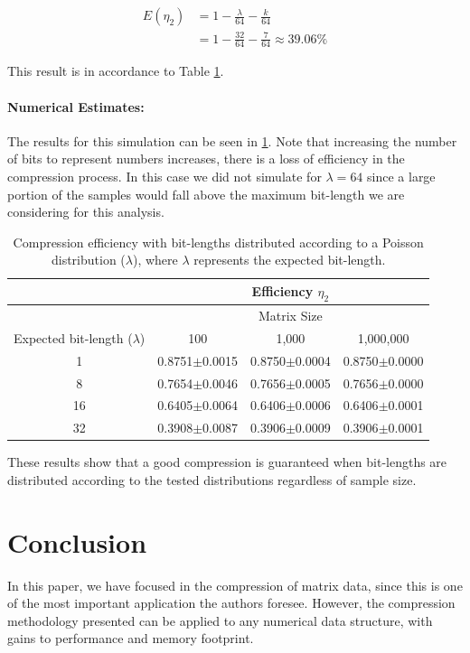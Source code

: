 \documentclass[10pt]{article}
\begin{document}
\begin{align}
 E(\eta_2) &= 1 - \frac{\lambda}{64} - \frac{k}{64} \label{eq:49} \\
 &= 1 - \frac{32}{64} - \frac{7}{64} \approx 39.06\% \label{eq:50}
\end{align}

This result is in accordance to Table \ref{tab:05}.
\paragraph{Numerical Estimates:}
The results for this simulation can be seen in \ref{tab:05}. Note that increasing the number of bits to represent numbers increases, there is a loss of efficiency in the compression process. In this case we did not simulate for $\lambda=64$ since a large portion of the samples would fall above the maximum bit-length we are considering for this analysis. 

 \begin{table}[h]
   \centering
   \caption{Compression efficiency with bit-lengths distributed according to a Poisson distribution ($\lambda$), where $\lambda$ represents the expected bit-length.}
  \begin{tabular}{cccc}
      \hline
      &&Efficiency $\eta_2$      & \\
      \hline
      &&Matrix Size& \\
      Expected bit-length ($\lambda$)	& 100	& 1,000		    & 1,000,000 \\
      \hline
      1 	& 0.8751$\pm$0.0015 	& 0.8750$\pm$0.0004 & 0.8750$\pm$0.0000 \\ 
      8 	& 0.7654$\pm$0.0046 	& 0.7656$\pm$0.0005 & 0.7656$\pm$0.0000 \\ 
      16 	& 0.6405$\pm$0.0064 	& 0.6406$\pm$0.0006 & 0.6406$\pm$0.0001 \\ 
      32 	& 0.3908$\pm$0.0087 	& 0.3906$\pm$0.0009 & 0.3906$\pm$0.0001 \\ 
      \hline
  \end{tabular}
  \label{tab:05}
 \end{table}

These results show that a good compression is guaranteed when bit-lengths are distributed according to the tested distributions regardless of sample size.

\section{Conclusion}
In this paper, we have focused in the compression of matrix data, since this is
one of the most important application the authors foresee. However, the
compression methodology presented can be applied to any numerical data
structure, with gains to performance and memory footprint\cite{teseCrysttian}. 
\end{document}

